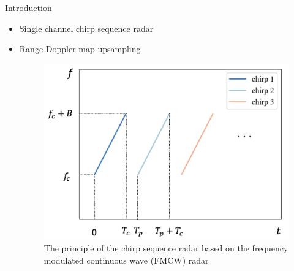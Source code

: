 \documentclass{beamer}
\begin{document}
\begin{frame}[t]{Introduction}
    \begin{itemize}
    	\item Single channel chirp sequence radar
        \vspace{0.5\baselineskip}
        \item Range-Doppler map upsampling
        \vspace{1.0\baselineskip}
            \begin{figure}
                \centering
                \hspace*{-0.5cm}
                \includegraphics[scale=.32]{MA_presentation/figures/chirp_sequence_radar.png}
                \caption{The principle of the chirp sequence radar based on the frequency modulated continuous wave (FMCW) radar}
            \end{figure}
    \end{itemize}

\end{frame}
\end{document}
